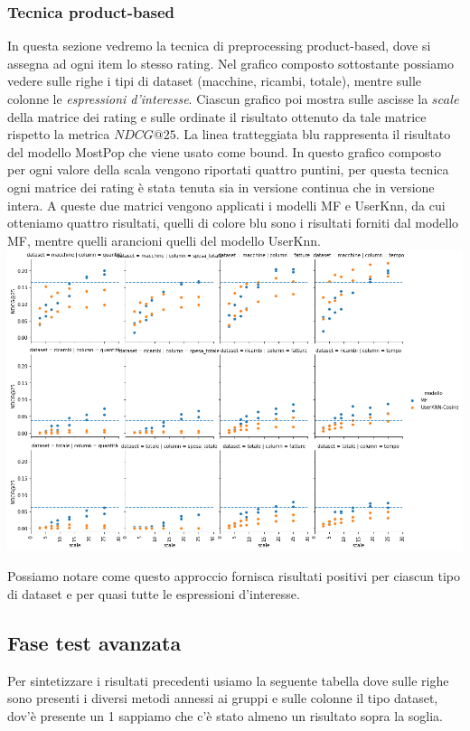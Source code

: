 \subsubsection{Tecnica product-based}
In questa sezione vedremo la tecnica di preprocessing product-based, dove si assegna ad ogni item lo stesso rating.
Nel grafico composto sottostante possiamo vedere sulle righe i tipi di dataset (macchine, ricambi, totale), mentre sulle colonne le \textit{espressioni d'interesse}. Ciascun grafico poi mostra sulle ascisse la $scale$ della matrice dei rating e sulle ordinate il risultato ottenuto da tale matrice rispetto la metrica $NDCG@25$. 
La linea tratteggiata blu rappresenta il risultato del modello MostPop che viene usato come bound.
In questo grafico composto per ogni valore della scala vengono riportati quattro puntini, per questa tecnica ogni matrice dei rating è stata tenuta sia in versione continua che in versione intera. A queste due matrici vengono applicati i modelli MF e UserKnn, da cui otteniamo quattro risultati, quelli di colore blu sono i risultati forniti dal modello MF, mentre quelli arancioni quelli del modello UserKnn.\\

\includegraphics[width=16cm]{figures/prodotto.png}

Possiamo notare come questo approccio fornisca risultati positivi per ciascun tipo di dataset e per quasi tutte le espressioni d'interesse.

\subsection{Fase test avanzata}
Per sintetizzare i risultati precedenti usiamo la seguente tabella dove sulle righe sono presenti i diversi metodi annessi ai gruppi e sulle colonne il tipo dataset, dov'è presente un 1 sappiamo che c'è stato almeno un risultato sopra la soglia.\\

